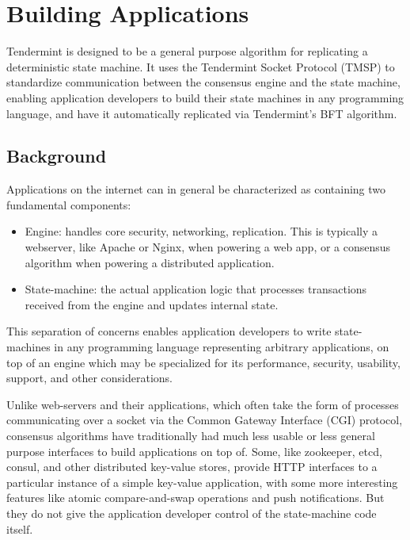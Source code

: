 \chapter{Building Applications}
\label{ch:apps}

Tendermint is designed to be a general purpose algorithm for replicating a deterministic state machine.
It uses the Tendermint Socket Protocol (TMSP) to standardize communication between the consensus engine and the state machine,
enabling application developers to build their state machines in any programming language, 
and have it automatically replicated via Tendermint's BFT algorithm.

\section{Background}

Applications on the internet can in general be characterized as containing two fundamental components:

\begin{itemize}
\item{Engine: handles core security, networking, replication. 
This is typically a webserver, like Apache or Nginx, when powering a web app, 
or a consensus algorithm when powering a distributed application.}
\item{State-machine: the actual application logic that processes transactions received from the engine and updates internal state.}
\end{itemize}

This separation of concerns enables application developers to write state-machines in any programming language representing arbitrary applications,
on top of an engine which may be specialized for its performance, security, usability, support, and other considerations.

Unlike web-servers and their applications, which often take the form of processes communicating over a socket via the Common Gateway Interface (CGI) protocol,
consensus algorithms have traditionally had much less usable or less general purpose interfaces to build applications on top of.
Some, like zookeeper, etcd, consul, and other distributed key-value stores, 
provide HTTP interfaces to a particular instance of a simple key-value application, 
with some more interesting features like atomic compare-and-swap operations and push notifications.
But they do not give the application developer control of the state-machine code itself.

